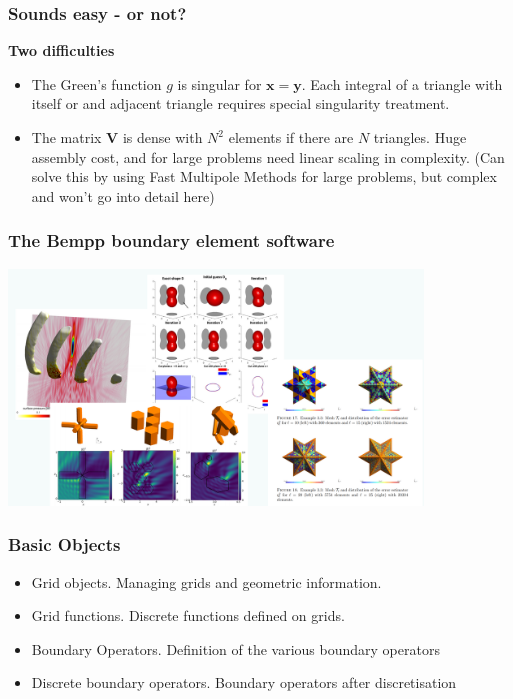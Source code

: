 \documentclass[dvipsnames,10pt]{beamer}
\def\bx{\mathbf{x}}
\def\by{\mathbf{y}}
\begin{document}
\begin{frame}

	\frametitle{Sounds easy - or not?}
	
	\textbf{Two difficulties}
	
	\begin{itemize}
	\item {\color{red} The Green's function $g$ is singular for $\bx=\by$}. Each integral of a triangle with itself or and adjacent triangle requires special singularity treatment.
	\item {\color{red} The matrix $\mathbf{V}$ is dense with $N^2$ elements if there are $N$ triangles}. Huge assembly cost, and for large problems
	need linear scaling in complexity. (Can solve this by using Fast Multipole Methods for large problems, but complex and won't go into detail here)
	
	\end{itemize}
	
	
\end{frame}
	
\begin{frame} 
	\frametitle{The Bempp boundary element software}

\begin{center}
\includegraphics[width=11cm]{../figs/applications}
\end{center}

\end{frame}
	
\begin{frame}

	\frametitle{Basic Objects}
	
	\begin{itemize}
		\item {\color{blue} Grid objects}. Managing grids and geometric information.
		\item {\color{blue} Grid functions}. Discrete functions defined on grids.
		\item {\color{blue} Boundary Operators}. Definition of the various boundary operators
		\item {\color{blue} Discrete boundary operators}. Boundary operators after discretisation
		
	\end{itemize}
	
\end{frame}
\end{document}
